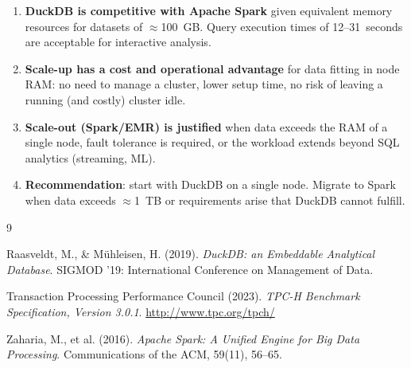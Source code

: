 \documentclass[12pt,a4paper]{article}
\begin{document}
\begin{enumerate}
  \item \textbf{DuckDB is competitive with Apache Spark} given equivalent memory
        resources for datasets of $\approx$100~GB. Query execution times of 12--31~seconds
        are acceptable for interactive analysis.
  \item \textbf{Scale-up has a cost and operational advantage} for data fitting in
        node RAM: no need to manage a cluster, lower setup time, no risk of leaving
        a running (and costly) cluster idle.
  \item \textbf{Scale-out (Spark/EMR) is justified} when data exceeds the RAM of a
        single node, fault tolerance is required, or the workload extends beyond SQL
        analytics (streaming, ML).
  \item \textbf{Recommendation}: start with DuckDB on a single node. Migrate to Spark
        when data exceeds $\approx$1~TB or requirements arise that DuckDB cannot fulfill.
\end{enumerate}

\begin{thebibliography}{9}

Raasveldt, M., \& M\"{u}hleisen, H. (2019).
\textit{DuckDB: an Embeddable Analytical Database}.
SIGMOD '19: International Conference on Management of Data.

Transaction Processing Performance Council (2023).
\textit{TPC-H Benchmark Specification, Version 3.0.1}.
\url{http://www.tpc.org/tpch/}

Zaharia, M., et al. (2016).
\textit{Apache Spark: A Unified Engine for Big Data Processing}.
Communications of the ACM, 59(11), 56--65.

\end{thebibliography}
\end{document}
